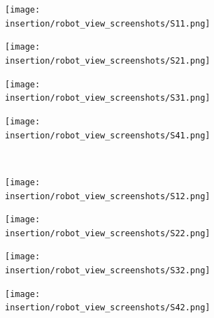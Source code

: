 \iffalse
\begin{figure}[thb]
    \centering
    \begin{subfigure}[b]{0.20\linewidth}
        \texttt{[image: insertion/robot\_view\_screenshots/S11.png]}\\
        \centering
    \end{subfigure} \hfill
    \begin{subfigure}[b]{0.20\linewidth}
        \texttt{[image: insertion/robot\_view\_screenshots/S21.png]}\\
        \centering
    \end{subfigure}   \hfill
    \begin{subfigure}[b]{0.20\linewidth}
        \texttt{[image: insertion/robot\_view\_screenshots/S31.png]}\\
        \centering
    \end{subfigure}   \hfill
    \begin{subfigure}[b]{0.20\linewidth}
        \texttt{[image: insertion/robot\_view\_screenshots/S41.png]}\\
        \centering
    \end{subfigure}      
    \\
    \vspace{10pt}
    \begin{subfigure}[b]{0.20\linewidth}
        \texttt{[image: insertion/robot\_view\_screenshots/S12.png]}\\
        \centering
    \end{subfigure} \hfill
    \begin{subfigure}[b]{0.20\linewidth}
        \texttt{[image: insertion/robot\_view\_screenshots/S22.png]}\\
        \centering
    \end{subfigure}     \hfill
    \begin{subfigure}[b]{0.20\linewidth}
        \texttt{[image: insertion/robot\_view\_screenshots/S32.png]}\\
        \centering
    \end{subfigure}  \hfill
    \begin{subfigure}[b]{0.20\linewidth}
        \texttt{[image: insertion/robot\_view\_screenshots/S42.png]}\\
        \centering
    \end{subfigure}    
    \\
    \vspace{10pt}
    \begin{subfigure}[b]{0.20\linewidth}

\end{subfigure}
\end{figure}
